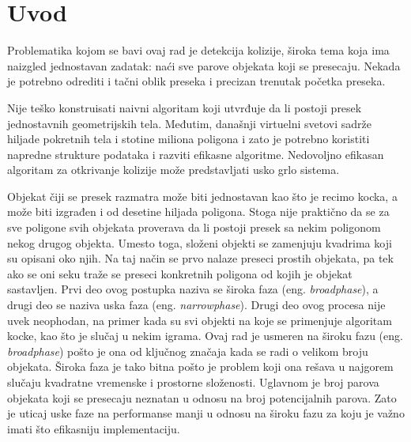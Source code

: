 \documentclass[12pt,oneside]{memoir}
\begin{document}
\frontmatter

\naslovna
\komisija
\apstrakt
\tableofcontents*

\mainmatter

\chapter{Uvod}
\label{sec:uvod}

Problematika kojom se bavi ovaj rad je detekcija kolizije, široka tema koja ima naizgled jednostavan zadatak:
naći sve parove objekata koji se presecaju. Nekada je potrebno odrediti i tačni oblik preseka i precizan trenutak početka preseka. 

Nije teško konstruisati naivni algoritam koji utvrđuje da li postoji presek jednostavnih geometrijskih tela.
Međutim, današnji virtuelni svetovi sadrže hiljade pokretnih tela i stotine miliona poligona i 
zato je potrebno koristiti napredne strukture podataka i razviti efikasne algoritme. 
Nedovoljno efikasan algoritam za otkrivanje kolizije može predstavljati usko grlo sistema.

Objekat čiji se presek razmatra može biti jednostavan kao što je recimo kocka, a može biti izgrađen i od desetine hiljada poligona.
Stoga nije praktično da se 
za sve poligone svih objekata proverava da li postoji presek sa nekim poligonom nekog drugog objekta.
Umesto toga, složeni objekti se zamenjuju kvadrima koji su opisani oko njih.
Na taj način se prvo nalaze preseci prostih objekata, pa tek ako se oni seku traže se preseci konkretnih poligona od kojih je objekat sastavljen.
%
Prvi deo ovog postupka naziva se široka faza (eng. {\em broadphase}), a drugi deo se naziva uska faza (eng. {\em narrowphase}).
Drugi deo ovog procesa nije uvek neophodan, na primer kada su svi objekti na koje se primenjuje algoritam kocke, kao što je slučaj u nekim igrama.
Ovaj rad je usmeren na široku fazu (eng. {\em broadphase}) pošto je ona od ključnog značaja kada se radi o velikom broju objekata.
Široka faza je tako bitna pošto je problem koji ona rešava u najgorem slučaju kvadratne vremenske i prostorne složenosti.
Uglavnom je broj parova objekata koji se presecaju neznatan u odnosu na broj potencijalnih parova. 
Zato je uticaj uske faze na performanse manji u odnosu na široku fazu za koju je važno imati što efikasniju implementaciju.
\end{document}
